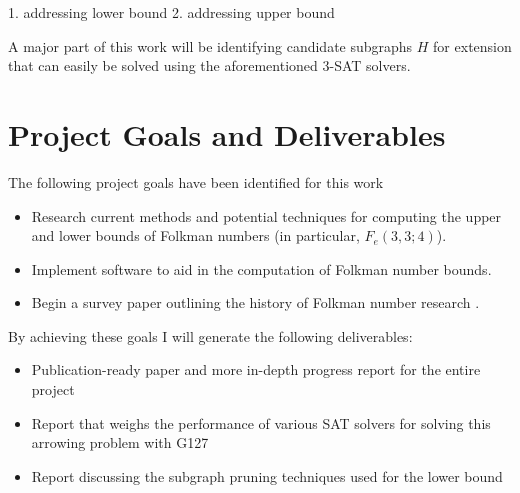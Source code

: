 \documentclass[paper=a4, fontsize=11pt]{scrartcl} %
\begin{document}
1. addressing lower bound
2. addressing upper bound

A major part of this work will be identifying
candidate subgraphs $H$ for extension that can easily be solved using the aforementioned 3-SAT solvers.

\section{Project Goals and Deliverables}
The following project goals have been identified for this work
\begin{itemize}
	\item Research current methods and potential techniques for computing the upper and lower bounds of Folkman numbers (in particular, $F_e(3,3;4)$).
	\item Implement software to aid in the computation of Folkman number bounds.
	\item Begin a survey paper outlining the history of Folkman number research \cite{sprSurvey}.
\end{itemize}

By achieving these goals I will generate the following deliverables:
\begin{itemize}
	\item Publication-ready paper and more in-depth progress report for the entire project
	\item Report that weighs the performance of various SAT solvers for solving this arrowing problem with G127
	\item Report discussing the subgraph pruning techniques used for the lower bound
\end{itemize}

\end{document}
